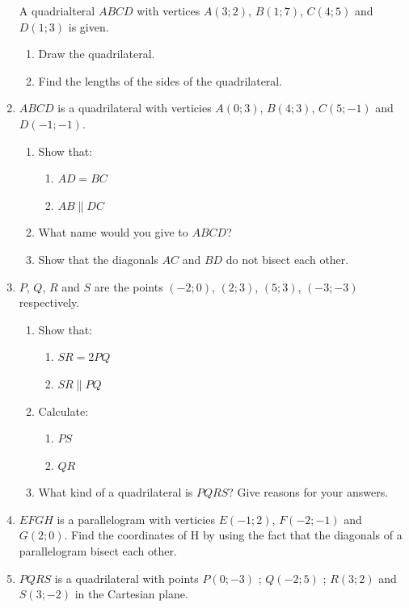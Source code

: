 \begin{eocexercises}{}
\begin{enumerate}[noitemsep, label=\textbf{\arabic*}. ]
A quadrialteral $ABCD$ with vertices $A(3;2)$, $B(1;7)$, $C(4;5)$ and $D(1;3)$ is given.
\begin{enumerate}[noitemsep, label=\textbf{\alph*}. ] 
\item  Draw the quadrilateral.
\item  Find the lengths of the sides of the quadrilateral.
\end{enumerate}
\item $ABCD$ is a quadrilateral with verticies $A(0;3)$, $B(4;3)$, $C(5;-1)$ and $D(-1;-1)$.
\begin{enumerate}[noitemsep, label=\textbf{\alph*}. ] 
\item Show that:
\begin{enumerate}[noitemsep, label=\textbf{\roman*}. ] 
\item $AD = BC$
\item $AB \parallel DC$
\end{enumerate}
\item What name would you give to $ABCD$?
\item Show that the diagonals $AC$ and $BD$ do not bisect each other.
\end{enumerate}
\item $P$, $Q$, $R$ and $S$ are the points $(-2;0)$, $(2;3)$, $(5;3)$, $(-3;-3)$ respectively.
\begin{enumerate}[noitemsep, label=\textbf{\alph*}. ] 
\item Show that:
\begin{enumerate}[noitemsep, label=\textbf{\roman*}. ] 
\item $SR = 2PQ$
\item $SR \parallel PQ$
\end{enumerate}
\item Calculate:
\begin{enumerate}[noitemsep, label=\textbf{\roman*}. ] 
\item $PS$
\item $QR$
\end{enumerate}
\item What kind of a quadrilateral is $PQRS$? Give reasons for your answers.
\end{enumerate}
\item $EFGH$ is a parallelogram with verticies $E(-1;2)$, $F(-2;-1)$ and $G(2;0)$. Find the coordinates of H by using the fact that the diagonals of a parallelogram bisect each other.\newline
\item  
$PQRS$ is a quadrilateral with points $P(0;-3)$ ; $Q(-2;5)$ ; $R(3;2)$ and $S(3;-2)$  in the Cartesian plane.

\end{enumerate}
\end{eocexercises}
